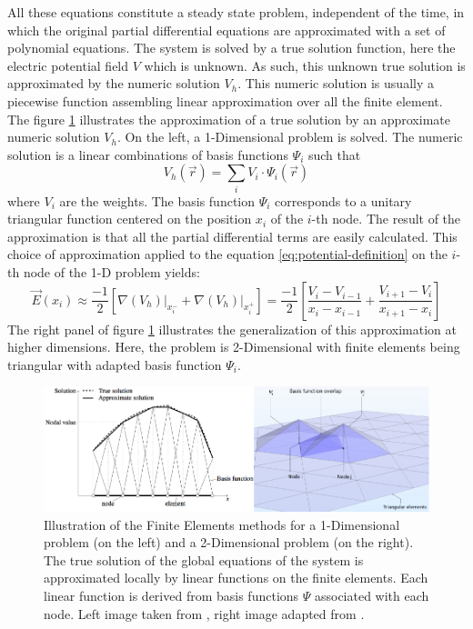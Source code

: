 All these equations constitute a steady state problem, independent of the time, in which the original partial differential equations are approximated with a set of polynomial equations. The system is solved by a true solution function, here the electric potential field $V$ which is unknown. As such, this unknown true solution is approximated by the numeric solution $V_h$. This numeric solution is usually a piecewise function assembling linear approximation over all the finite element. 
The figure \ref{fig:fem-illustration} illustrates the approximation of a true solution by an approximate numeric solution $V_h$. On the left, a 1-Dimensional problem is solved. The numeric solution is a linear combinations of basis functions $\Psi_i$ such that
\begin{equation}
V_h (\vec{r}) = \sum_i V_i \cdot \Psi_i (\vec{r})
\end{equation}
where $V_i$ are the weights. The basis function $\Psi_i$ corresponds to a unitary triangular function centered on the position $x_i$ of the $i$-th node.
The result of the approximation is that all the partial differential terms are easily calculated. This choice of approximation applied to the equation \ref{eq:potential-definition} on the $i$-th node of the 1-D problem yields:
\begin{equation}
\vec{E} (x_i)
\approx
\frac{-1}{2}
\left[
\left. \nabla \left( V_h \right) \right\vert_{x_i^-}
+
\left. \nabla \left( V_h \right) \right\vert_{x_i^+}
\right]
=
\frac{-1}{2}
\left[
\frac{V_i - V_{i-1}}{x_i - x_{i-1}}
+
\frac{V_{i+1} - V_i}{x_{i+1} - x_i}
\right]
\end{equation}
The right panel of figure \ref{fig:fem-illustration} illustrates the generalization of this approximation at higher dimensions. Here, the problem is 2-Dimensional with finite elements being triangular with adapted basis function $\Psi_i$.

\begin{figure}
\centering
\includegraphics[scale=1]{Figures/Electrodes/fem_illustration.pdf}
\caption{Illustration of the Finite Elements methods for a 1-Dimensional problem (on the left) and a 2-Dimensional problem (on the right). The true solution of the global equations of the system is approximated locally by linear functions on the finite elements. Each linear function is derived from basis functions $\Psi$ associated with each node. Left image taken from \cite{Rovitto:2016}, right image adapted from \cite{comsol}.}
\label{fig:fem-illustration}
\end{figure}

